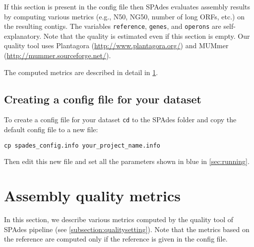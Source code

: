 \documentclass{article}
\def\spades{SPAdes}
\begin{document}
If this section is present in the config file then
{\spades} evaluates assembly results by computing various metrics (e.g., N50, NG50, number of long ORFs, etc.) on the resulting contigs.
The variables {\tt reference}, {\tt genes}, and {\tt operons} are self-explanatory.
Note that the quality is estimated even if this section is empty. Our quality tool uses Plantagora (\url{http://www.plantagora.org/}) and MUMmer (\url{http://mummer.sourceforge.net/}).

The computed metrics are described in detail in \cref{section:metrics}.

\subsection{Creating a config file for your dataset}
To create a config file for your dataset {\tt cd} to the {\spades} folder
and copy the default config file to a new file:
\begin{lstlisting}
cp spades_config.info your_project_name.info
\end{lstlisting}
Then edit this new file and set all the parameters
shown in blue in \cref{sec:running}.


\section{Assembly quality metrics}\label{section:metrics}
In this section, we describe various metrics computed by the quality tool
of {\spades} pipeline (see \cref{subsection:qualitysetting}). Note that 
the metrics based on the reference are computed only if the reference is given
in the config file.
\end{document}
